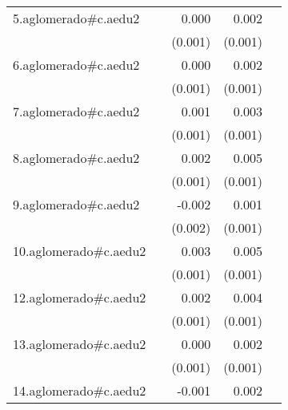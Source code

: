 {\begin{longtable}{l*{4}{D{.}{.}{-1}}}
\addlinespace
5.aglomerado#c.aedu2&                     &       0.000         &       0.002\sym{**} &                     \\
            &                     &     (0.001)         &     (0.001)         &                     \\
\addlinespace
6.aglomerado#c.aedu2&                     &       0.000         &       0.002\sym{*}  &                     \\
            &                     &     (0.001)         &     (0.001)         &                     \\
\addlinespace
7.aglomerado#c.aedu2&                     &       0.001         &       0.003\sym{***}&                     \\
            &                     &     (0.001)         &     (0.001)         &                     \\
\addlinespace
8.aglomerado#c.aedu2&                     &       0.002         &       0.005\sym{***}&                     \\
            &                     &     (0.001)         &     (0.001)         &                     \\
\addlinespace
9.aglomerado#c.aedu2&                     &      -0.002         &       0.001         &                     \\
            &                     &     (0.002)         &     (0.001)         &                     \\
\addlinespace
10.aglomerado#c.aedu2&                     &       0.003\sym{**} &       0.005\sym{***}&                     \\
            &                     &     (0.001)         &     (0.001)         &                     \\
\addlinespace
12.aglomerado#c.aedu2&                     &       0.002         &       0.004\sym{***}&                     \\
            &                     &     (0.001)         &     (0.001)         &                     \\
\addlinespace
13.aglomerado#c.aedu2&                     &       0.000         &       0.002\sym{**} &                     \\
            &                     &     (0.001)         &     (0.001)         &                     \\
\addlinespace
14.aglomerado#c.aedu2&                     &      -0.001         &       0.002         &                     \\

\end{longtable}}
